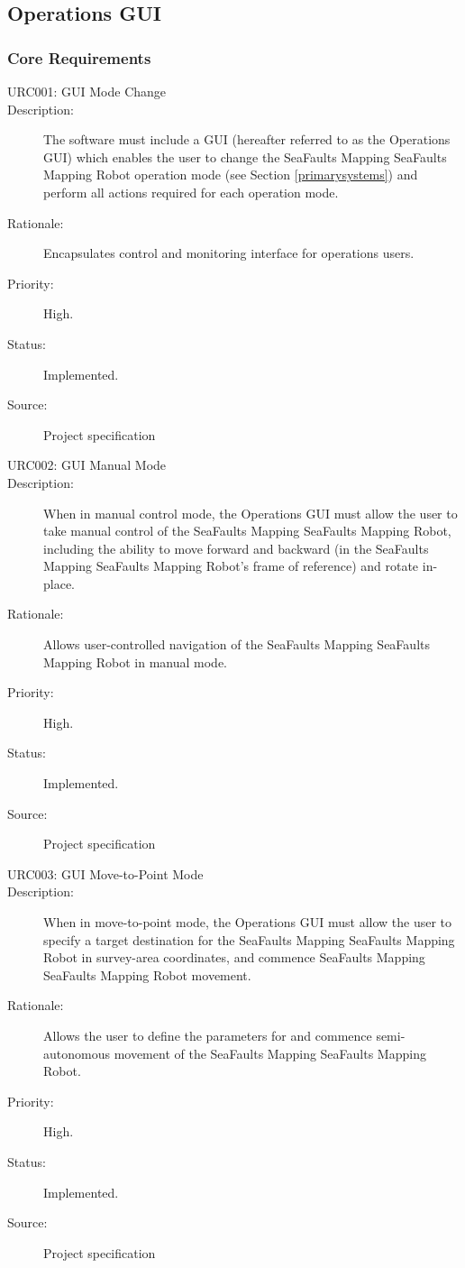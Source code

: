 \documentclass[12pt]{article}
\begin{document}
\subsection{Operations GUI}

\subsubsection{Core Requirements}
\begin{description}
\item [{URC001: GUI Mode Change}\label{URC001}] 
\item [{Description: }\label{Description}] The software must include a GUI (hereafter referred to as the Operations GUI) which enables the user to change the SeaFaults Mapping SeaFaults Mapping Robot operation mode (see Section \ref{primarysystems}) and perform all actions required for each operation mode. 
\item[{Rationale: }\label{Rationale}] Encapsulates control and monitoring interface for operations users.
\item[{Priority: }\label{Priority}] High.
\item[{Status: }\label{Status}] Implemented.
\item[{Source: }\label{Source}] Project specification \cite{spec}

\item [{URC002: GUI Manual Mode}\label{URC002}] 
\item [{Description: }\label{Description}] When in manual control mode, the Operations GUI must allow the user to take manual control of the SeaFaults Mapping SeaFaults Mapping Robot, including the ability to move forward and backward (in the SeaFaults Mapping SeaFaults Mapping Robot's frame of reference) and rotate in-place. 
\item[{Rationale: }\label{Rationale}] Allows user-controlled navigation of the SeaFaults Mapping SeaFaults Mapping Robot in manual mode.
\item[{Priority: }\label{Priority}] High.
\item[{Status: }\label{Status}] Implemented.
\item[{Source: }\label{Source}] Project specification \cite{spec}

\item [{URC003: GUI Move-to-Point Mode}\label{URC003}] 
\item [{Description: }\label{Description}] When in move-to-point mode, the Operations GUI must allow the user to specify a target destination for the SeaFaults Mapping SeaFaults Mapping Robot in survey-area coordinates, and commence SeaFaults Mapping SeaFaults Mapping Robot movement. 
\item[{Rationale: }\label{Rationale}] Allows the user to define the parameters for and commence semi-autonomous movement of the SeaFaults Mapping SeaFaults Mapping Robot.
\item[{Priority: }\label{Priority}] High.
\item[{Status: }\label{Status}] Implemented.
\item[{Source: }\label{Source}] Project specification \cite{spec}


\end{description}
\end{document}
